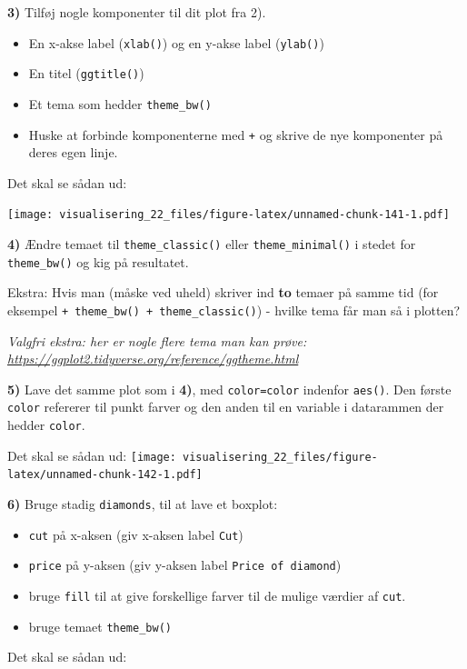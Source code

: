 \documentclass[
]{book}
\providecommand{\tightlist}{%
  \setlength{\itemsep}{0pt}\setlength{\parskip}{0pt}}
\begin{document}
\textbf{3)} Tilføj nogle komponenter til dit plot fra 2).

\begin{itemize}
\tightlist
\item
  En x-akse label (\texttt{xlab()}) og en y-akse label (\texttt{ylab()})
\item
  En titel (\texttt{ggtitle()})
\item
  Et tema som hedder \texttt{theme\_bw()}
\item
  Huske at forbinde komponenterne med \texttt{+} og skrive de nye komponenter på deres egen linje.
\end{itemize}

Det skal se sådan ud:

\texttt{[image: visualisering\_22\_files/figure-latex/unnamed-chunk-141-1.pdf]}

\textbf{4)} Ændre temaet til \texttt{theme\_classic()} eller \texttt{theme\_minimal()} i stedet for \texttt{theme\_bw()} og kig på resultatet.

Ekstra: Hvis man (måske ved uheld) skriver ind \textbf{to} temaer på samme tid (for eksempel \texttt{+\ theme\_bw()\ +\ theme\_classic()}) - hvilke tema får man så i plotten?

\emph{Valgfri ekstra: her er nogle flere tema man kan prøve: \url{https://ggplot2.tidyverse.org/reference/ggtheme.html}}

\textbf{5)} Lave det samme plot som i \textbf{4)}, med \texttt{color=color} indenfor \texttt{aes()}. Den første \texttt{color} refererer til punkt farver og den anden til en variable i datarammen der hedder \texttt{color}.

Det skal se sådan ud:
\texttt{[image: visualisering\_22\_files/figure-latex/unnamed-chunk-142-1.pdf]}

\textbf{6)} Bruge stadig \texttt{diamonds}, til at lave et boxplot:

\begin{itemize}
\tightlist
\item
  \texttt{cut} på x-aksen (giv x-aksen label \texttt{Cut})
\item
  \texttt{price} på y-aksen (giv y-aksen label \texttt{Price\ of\ diamond})
\item
  bruge \texttt{fill} til at give forskellige farver til de mulige værdier af \texttt{cut}.
\item
  bruge temaet \texttt{theme\_bw()}
\end{itemize}

Det skal se sådan ud:
\end{document}

